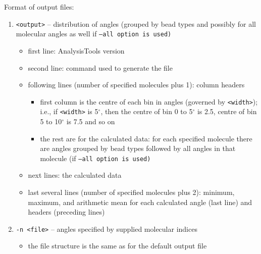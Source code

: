 \noindent
Format of output files:
\begin{enumerate}[nosep,leftmargin=20pt]
  \item \texttt{<output>} -- distribution of angles (grouped by bead types and
    possibly for all molecular angles as well if \tt{--all} option is used)
    \begin{itemize}[nosep,leftmargin=5pt]
      \item first line: AnalysisTools version
      \item second line: command used to generate the file
      \item following lines (number of specified molecules plus 1): column
        headers
        \begin{itemize}[nosep,leftmargin=10pt]
          \item first column is the centre of each bin in angles (governed by
            \texttt{<width>}); i.e., if \texttt{<width>} is 5$^{\circ}$,
            then the centre of bin 0 to 5$^{\circ}$ is 2.5, centre of bin 5
            to 10$^{\circ}$ is 7.5 and so on
          \item the rest are for the calculated data: for each specified
            molecule there are angles grouped by bead types followed by all
            angles in that molecule (if \tt{--all} option is used)
        \end{itemize}
      \item next lines: the calculated data
      \item last several lines (number of specified molecules plus 2): minimum,
        maximum, and arithmetic mean for each calculated angle (last line) and
        headers (preceding lines)
    \end{itemize}
  \item \texttt{-n <file>} -- angles specified by supplied molecular indices
  \begin{itemize}[nosep,leftmargin=5pt]
    \item the file structure is the same as for the default output file
  \end{itemize}
\end{enumerate}
